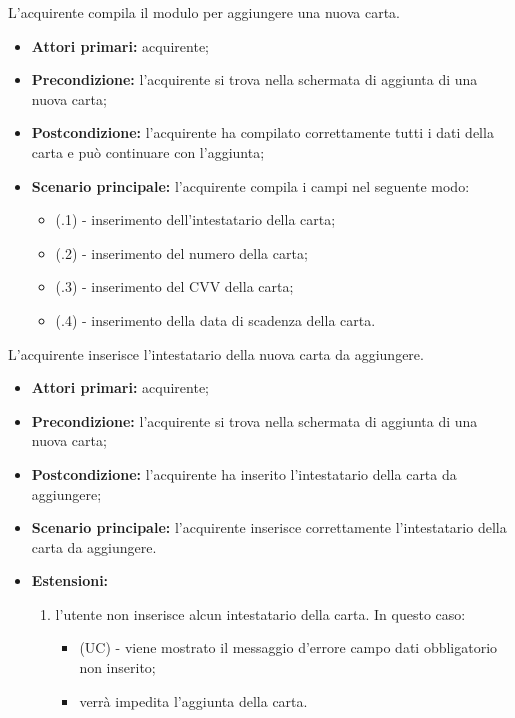 \resetSubUC

L'acquirente compila il modulo per aggiungere una nuova carta.
\begin{itemize}
	\item \textbf{Attori primari:} acquirente;
	\item \textbf{Precondizione:} l'acquirente si trova nella schermata di aggiunta di una nuova carta;
	\item \textbf{Postcondizione:} l'acquirente ha compilato correttamente tutti i dati della carta e può continuare con l'aggiunta;
	\item \textbf{Scenario principale:} l'acquirente compila i campi nel seguente modo:
	\begin{itemize}
		\item (\actualSubUC.1) - inserimento dell'intestatario della carta;
		\item (\actualSubUC.2) - inserimento del numero della carta;
		\item (\actualSubUC.3) - inserimento del CVV della carta;
		\item (\actualSubUC.4) - inserimento della data di scadenza della carta.
	\end{itemize}
\end{itemize}

\resetSubSubUC

L'acquirente inserisce l'intestatario della nuova carta da aggiungere.
\begin{itemize}
    \item \textbf{Attori primari:} acquirente;
    \item \textbf{Precondizione:} l'acquirente si trova nella schermata di aggiunta di una nuova carta;
    \item \textbf{Postcondizione:} l'acquirente ha inserito l'intestatario della carta da aggiungere;
    \item \textbf{Scenario principale:} l'acquirente inserisce correttamente l'intestatario della carta da aggiungere.
    \item \textbf{Estensioni:}
    \begin{enumerate}[label=\lett]
        \item l'utente non inserisce alcun intestatario della carta. In questo caso:
        \begin{itemize}
            \item (UC) - viene mostrato il messaggio d'errore campo dati obbligatorio non inserito;
            \item verrà impedita l'aggiunta della carta.
        \end{itemize}
    \end{enumerate}
\end{itemize}

